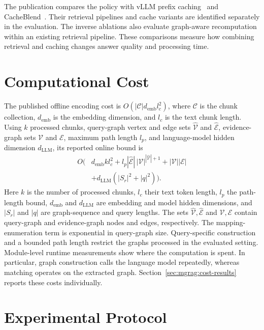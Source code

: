 The publication compares the policy with vLLM prefix caching~\cite{mgrag-kwon2023efficient} and CacheBlend~\cite{mgrag-yao2025cacheblend}. Their retrieval pipelines and cache variants are identified separately in the evaluation. The inverse ablations also evaluate graph-aware recomputation within an existing retrieval pipeline. These comparisons measure how combining retrieval and caching changes answer quality and processing time.

\section{Computational Cost}
\label{sec:mgrag:complexity}

The published offline encoding cost is $O(|\mathcal C|d_{\mathrm{emb}}l_c^2)$, where $\mathcal C$ is the chunk collection, $d_{\mathrm{emb}}$ is the embedding dimension, and $l_c$ is the text chunk length. Using $k$ processed chunks, query-graph vertex and edge sets $\widehat{\mathcal V}$ and $\widehat{\mathcal E}$, evidence-graph sets $\mathcal V$ and $\mathcal E$, maximum path length $l_p$, and language-model hidden dimension $d_{\mathrm{LLM}}$, its reported online bound is
\begin{equation}
\begin{split}
 O\bigl(&d_{\mathrm{emb}}kl_c^2
 +l_p|\widehat{\mathcal E}|\,|\mathcal V|^{|\widehat{\mathcal V}|+1}
 +|\mathcal V||\mathcal E|\\
 &+d_{\mathrm{LLM}}(|S_r|^2+|q|^2)\bigr).
\end{split}
\label{eq:mgrag:complexity}
\end{equation}
Here $k$ is the number of processed chunks, $l_c$ their text token length, $l_p$ the path-length bound, $d_{\mathrm{emb}}$ and $d_{\mathrm{LLM}}$ are embedding and model hidden dimensions, and $|S_r|$ and $|q|$ are graph-sequence and query lengths. The sets $\widehat{\mathcal V},\widehat{\mathcal E}$ and $\mathcal V,\mathcal E$ contain query-graph and evidence-graph nodes and edges, respectively. The mapping-enumeration term is exponential in query-graph size. Query-specific construction and a bounded path length restrict the graphs processed in the evaluated setting. Module-level runtime measurements show where the computation is spent. In particular, graph construction calls the language model repeatedly, whereas matching operates on the extracted graph. Section~\ref{sec:mgrag:cost-results} reports these costs individually.

\section{Experimental Protocol}
\label{sec:mgrag:protocol}

